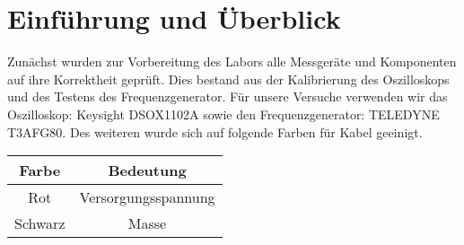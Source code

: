 \chapter{Einführung und Überblick}
Zunächst wurden zur Vorbereitung des Labors alle Messgeräte und Komponenten auf ihre Korrektheit geprüft.
Dies bestand aus der Kalibrierung des Oszilloskops und des Testens des Frequenzgenerator. \newline
Für unsere Versuche verwenden wir das Oszilloskop: Keysight DSOX1102A \newline
sowie den Frequenzgenerator: TELEDYNE T3AFG80.\newline
Des weiteren wurde sich auf folgende Farben für Kabel geeinigt.

\begin{tabular}[h]{c|c}
    Farbe & Bedeutung\\
    \hline
    Rot & Versorgungsspannung \\
    \hline
    Schwarz & Masse 
        \label{tab:Farbenzuordnung}
   \end{tabular}


